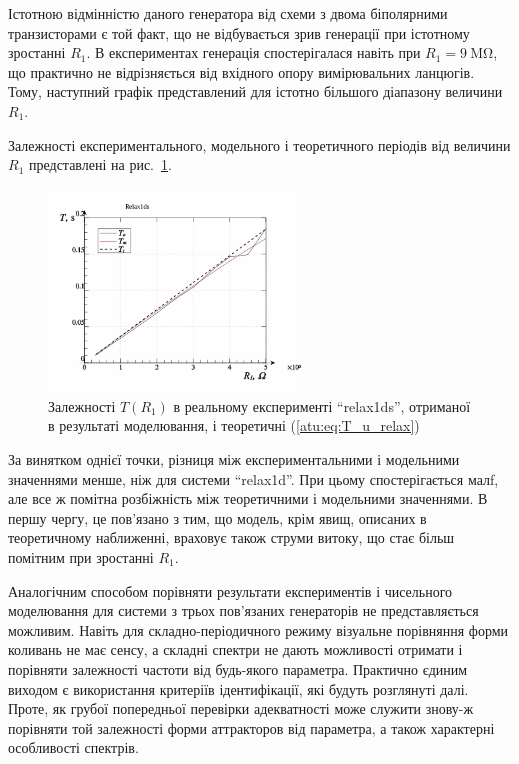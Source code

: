 Істотною відмінністю даного генератора від схеми з двома
біполярними транзисторами є той факт, що не відбувається зрив
генерації при істотному зростанні
$R_1$. В експериментах генерація спостерігалася навіть при
$ R_1 = \SI{9}{\mega \ohm} $, що практично не відрізняється від вхідного
опору вимірювальних ланцюгів. Тому, наступний графік
представлений для істотно більшого діапазону величини
$R_1$.

Залежності експериментального, модельного і теоретичного періодів
від величини
$ R_1 $ представлені на рис.~\ref{atu:f:relax1ds_read_cmp-p_R1_T}.


\begin{figure}[htb!]
  \centerline{\includegraphics[width=0.6\textwidth]{p/relax1ds_read_cmp-p_R1_T.png} }
\caption{Залежності $ T (R_1) $ в реальному експерименті ``relax1ds'', отриманої в результаті моделювання, і теоретичні (\ref{atu:eq:T_u_relax})}
\label{atu:f:relax1ds_read_cmp-p_R1_T}
\end{figure}

За винятком однієї точки, різниця між експериментальними
і модельними значеннями менше, ніж для системи ``relax1d''. При
цьому спостерігається малf, але все ж помітна розбіжність між
теоретичними і модельними значеннями. В першу чергу, це пов'язано
з тим, що модель, крім явищ, описаних в теоретичному наближенні,
враховує також струми витоку, що стає більш помітним при
зростанні $R_1$.

Аналогічним способом порівняти результати експериментів
і чисельного моделювання для системи з трьох пов'язаних
генераторів не представляється можливим. Навіть для
складно-періодичного режиму візуальне порівняння форми
коливань не має сенсу, а складні спектри не дають можливості
отримати і порівняти залежності частоти від будь-якого
параметра. Практично єдиним виходом є використання критеріїв
ідентифікації, які будуть розглянуті далі. Проте, як грубої
попередньої перевірки адекватності може служити знову-ж
порівняти той залежності форми аттракторов від параметра, а
також характерні особливості спектрів.

